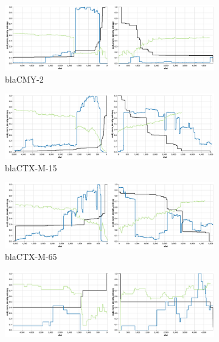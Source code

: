 \documentclass[rmp,superscriptaddress,10pt,onecolumn]{revtex4-1}
\begin{document}
\begin{figure}
     \centering
     \begin{subfigure}[b]{0.45\linewidth}
         \centering
         \includegraphics[width=\textwidth]{figs_supp/CMY-2.png}
         \caption{blaCMY-2}
     \end{subfigure}
     \hfill
     \begin{subfigure}[b]{0.45\linewidth}
         \centering
         \includegraphics[width=\textwidth]{figs_supp/CTX-M-15.png}
         \caption{blaCTX-M-15}
     \end{subfigure}
     \hfill
     \begin{subfigure}[b]{0.45\textwidth}
         \centering
         \includegraphics[width=\textwidth]{figs_supp/CTX-M-65.png}
         \caption{blaCTX-M-65}
     \end{subfigure}
          \hfill
     \begin{subfigure}[b]{0.45\textwidth}
         \centering
         \includegraphics[width=\textwidth]{figs_supp/GES-1.png}

\end{subfigure}
\end{figure}
\end{document}
